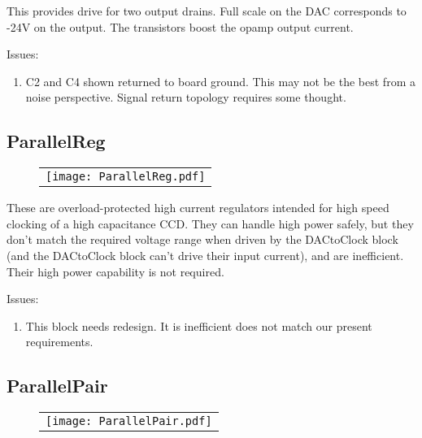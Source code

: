 \documentclass[a4paper,12pt]{article}
\begin{document}
This provides drive for two output drains. Full scale on the DAC corresponds to -24V on the output. The transistors boost the opamp output current.


Issues:
\begin{enumerate}
\item
C2 and C4 shown returned to board ground. This may not be the best from a noise perspective. Signal return topology requires some thought.
\end{enumerate}


\subsection{ParallelReg}
   \begin{figure}
   \begin{center}
   \begin{tabular}{c}
   \texttt{[image: ParallelReg.pdf]}
   \end{tabular}
   \end{center}
   \end{figure}

These are overload-protected high current regulators intended for high speed clocking of a high capacitance CCD. They can handle high power safely, but they don't match the required voltage range when driven by the DACtoClock block (and the DACtoClock block can't drive their input current), and are inefficient. Their high power capability is not required.

Issues:
\begin{enumerate}
\item
This block needs redesign. It is inefficient does not match our present requirements.
\end{enumerate}



\subsection{ParallelPair}

   \begin{figure}
   \begin{center}
   \begin{tabular}{c}
   \texttt{[image: ParallelPair.pdf]}
   \end{tabular}
   \end{center}
   \end{figure}
\end{document}

